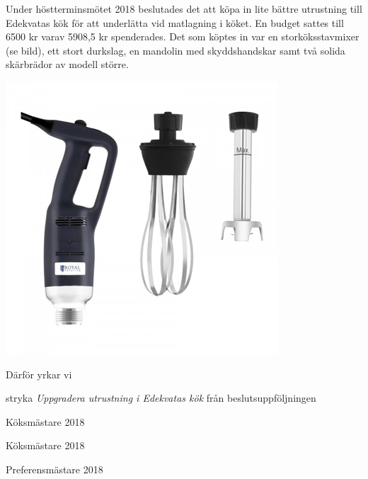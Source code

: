 \documentclass[../_main/handlingar.tex]{subfiles}
\begin{document}

    Under höstterminsmötet 2018 beslutades det att köpa in lite bättre utrustning till Edekvatas
    kök för att underlätta vid matlagning i köket. En budget sattes till 6500 kr varav 5908,5 kr
    spenderades. Det som köptes in var en storköksstavmixer (se bild), ett stort durkslag, en
    mandolin med skyddshandskar samt två solida skärbrädor av modell större. 


    \begin{center}
     \includegraphics[scale=1]{../_res/mixer.png}
    \end{center}


    Därför yrkar vi
\begin{attsatser}
    \att stryka \emph{Uppgradera utrustning i Edekvatas kök} från beslutsuppföljningen
\end{attsatser}

\begin{signatures}{3}
    \signature{Filip Larsson}{Köksmästare 2018}
    \signature{Fredrik Berg}{Köksmästare 2018}
    \signature{Y Nhi Pham}{Preferensmästare 2018}
\end{signatures}
\end{document}
